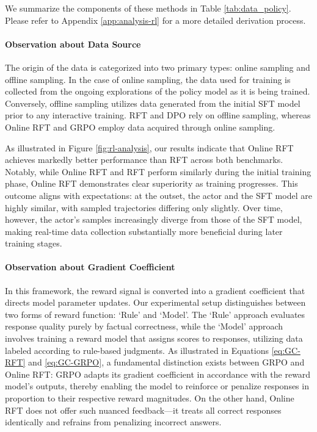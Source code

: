 \begin{itemize}[topsep=0pt]
\begin{itemize}[topsep=0pt]
We summarize the components of these methods in Table \ref{tab:data_policy}.
Please refer to Appendix \ref{app:analysis-rl} for a more detailed derivation process.

\paragraph{Observation about Data Source} The origin of the data is categorized into two primary types: online sampling and offline sampling. In the case of online sampling, the data used for training is collected from the ongoing explorations of the policy model as it is being trained. Conversely, offline sampling utilizes data generated from the initial SFT model prior to any interactive training. RFT and DPO rely on offline sampling, whereas Online RFT and GRPO employ data acquired through online sampling.

As illustrated in Figure \ref{fig:rl-analysis}, our results indicate that Online RFT achieves markedly better performance than RFT across both benchmarks. Notably, while Online RFT and RFT perform similarly during the initial training phase, Online RFT demonstrates clear superiority as training progresses. This outcome aligns with expectations: at the outset, the actor and the SFT model are highly similar, with sampled trajectories differing only slightly. Over time, however, the actor’s samples increasingly diverge from those of the SFT model, making real-time data collection substantially more beneficial during later training stages.

\paragraph{Observation about Gradient Coefficient} In this framework, the reward signal is converted into a gradient coefficient that directs model parameter updates. Our experimental setup distinguishes between two forms of reward function: `Rule' and `Model'. The `Rule' approach evaluates response quality purely by factual correctness, while the `Model' approach involves training a reward model that assigns scores to responses, utilizing data labeled according to rule-based judgments. As illustrated in Equations \ref{eq:GC-RFT} and \ref{eq:GC-GRPO}, a fundamental distinction exists between GRPO and Online RFT: GRPO adapts its gradient coefficient in accordance with the reward model's outputs, thereby enabling the model to reinforce or penalize responses in proportion to their respective reward magnitudes. On the other hand, Online RFT does not offer such nuanced feedback—it treats all correct responses identically and refrains from penalizing incorrect answers.


\end{itemize}
\end{itemize}
